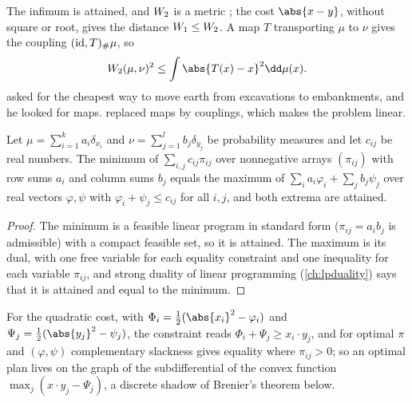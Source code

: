 \begin{refsection}
The infimum is attained, and $W_2$ is a metric \parencite{Villani2003}; the cost $\abs{x-y}$, without square or root, gives the distance $W_1\le W_2$. A map $T$ transporting $\mu$ to $\nu$ gives the coupling $(\mathrm{id},T)_{\#}\mu$, so
\begin{equation}\label{eq:transport:mapbound}
\transportW(\mu,\nu)^2\le\int\abs{T(x)-x}^2\dd\mu(x).
\end{equation}
\textcite{Monge1781} asked for the cheapest way to move earth from excavations to embankments, and he looked for maps. \textcite{Kantorovich1942} replaced maps by couplings, which makes the problem linear.

\begin{theorem}\label{thm:transport:kantorovich}
Let $\mu=\sum_{i=1}^k a_i\delta_{x_i}$ and $\nu=\sum_{j=1}^l b_j\delta_{y_j}$ be probability measures and let $c_{ij}$ be real numbers. The minimum of $\sum_{i,j}c_{ij}\pi_{ij}$ over nonnegative arrays $(\pi_{ij})$ with row sums $a_i$ and column sums $b_j$ equals the maximum of $\sum_ia_i\varphi_i+\sum_jb_j\psi_j$ over real vectors $\varphi,\psi$ with $\varphi_i+\psi_j\le c_{ij}$ for all $i,j$, and both extrema are attained.
\end{theorem}

\begin{proof}
The minimum is a feasible linear program in standard form ($\pi_{ij}=a_ib_j$ is admissible) with a compact feasible set, so it is attained. The maximum is its dual, with one free variable for each equality constraint and one inequality for each variable $\pi_{ij}$, and strong duality of linear programming (\cref{ch:lpduality}) says that it is attained and equal to the minimum.
\end{proof}

For the quadratic cost, with $\Phi_i=\frac12(\abs{x_i}^2-\varphi_i)$ and $\Psi_j=\frac12(\abs{y_j}^2-\psi_j)$, the constraint reads $\Phi_i+\Psi_j\ge x_i\cdot y_j$, and for optimal $\pi$ and $(\varphi,\psi)$ complementary slackness gives equality where $\pi_{ij}>0$; so an optimal plan lives on the graph of the subdifferential of the convex function $\max_j(x\cdot y_j-\Psi_j)$, a discrete shadow of Brenier's theorem below.


\end{refsection}
